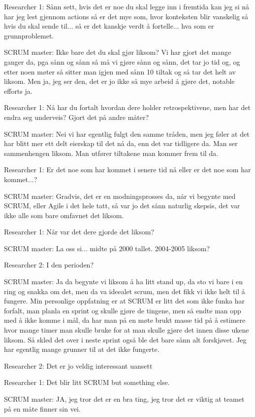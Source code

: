 \documentclass[12pt, a4paper]{report}
\begin{document}
Researcher 1: Sånn sett, hvis det er noe du skal legge inn i fremtida kan jeg si nå har jeg lest gjennom actions så er det mye som, hvor konteksten blir vanskelig så hvis du skal sende til... så er det kanskje verdt å fortelle... hva som er grunnproblemet. 

SCRUM master: Ikke bare det du skal gjør liksom? Vi har gjort det mange ganger da, pga sånn og sånn så må vi gjøre sånn og sånn, det tar jo tid og, og etter noen møter så sitter man igjen med sånn 10 tiltak og så tar det helt av liksom. Men ja, jeg ser den, det er jo ikke så mye arbeid å gjøre det, notable efforts ja. 

Researcher 1: Nå har du fortalt hvordan dere holder retrospektivene, men har det endra seg underveis? Gjort det på andre måter?

SCRUM master: Nei vi har egentlig fulgt den samme tråden, men jeg føler at det har blitt mer ett delt eierskap til det nå da, enn det var tidligere da. Man ser sammenhengen liksom. Man utfører tiltakene man kommer frem til da.

Researcher 1: Er det noe som har kommet i senere tid nå eller er det noe som har kommet...?

SCRUM master: Gradvis, det er en modningsprosses da, når vi begynte med SCRUM, eller Agile i det hele tatt, så var jo det sånn naturlig skepsis, det var ikke alle som bare omfavnet det liksom.

Researcher 1: Når var det dere gjorde det liksom?

SCRUM master: La oss si... midte på 2000 tallet. 2004-2005 liksom?

Researcher 2: I den perioden?

SCRUM master: Ja da begynte vi liksom å ha litt stand up, da sto vi bare i en ring og snakka om det, men da va ideealet scrum, men det fikk vi ikke helt til å fungere. Min personlige oppfatning er at SCRUM er litt det som ikke funka har forfalt, man planla en sprint og skulle gjøre de tingene, men så endte man opp med å ikke komme i mål, da har man på en møte brukt masse tid på å estimere hvor mange timer man skulle bruke for at man skulle gjøre det innen disse ukene liksom. Så skled det over i neste sprint også ble det bare sånn alt forskjøvet. Jeg har egentlig mange grunner til at det ikke fungerte.

Researcher 2: Det er jo veldig interessant uansett

Researcher 1: Det blir litt SCRUM but something else.

SCRUM master: JA, jeg tror det er en bra ting, jeg tror det er viktig at teamet på en måte finner sin vei. 
\end{document}
